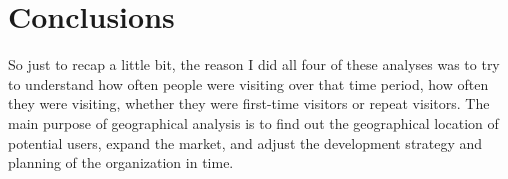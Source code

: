 \section{Conclusions} \label{sec-conclusions}
So just to recap a little bit, the reason I did all four of these analyses was to try to understand how often people were visiting over that time period, how often they were visiting, whether they were first-time visitors or repeat visitors.
The main purpose of geographical analysis is to find out the geographical location of potential users, expand the market, and adjust the development strategy and planning of the organization in time.








